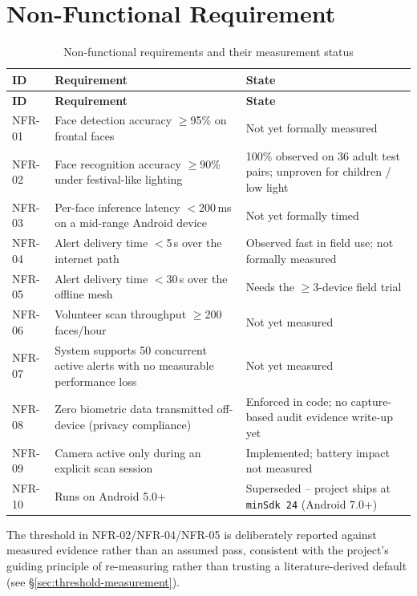 \documentclass[12pt,a4paper,oneside]{report}
\newcommand{\code}[1]{\texttt{#1}}
\begin{document}
\section{Non-Functional Requirement}

\begin{longtable}{|p{1.4cm}|p{7.4cm}|p{4.0cm}|}
\caption{Non-functional requirements and their measurement status}
\label{tab:nfr}\\
\hline
\textbf{ID} & \textbf{Requirement} & \textbf{State} \\
\hline
\endfirsthead
\hline
\textbf{ID} & \textbf{Requirement} & \textbf{State} \\
\hline
\endhead
NFR-01 & Face detection accuracy $\geq$95\% on frontal faces & Not yet formally measured \\ \hline
NFR-02 & Face recognition accuracy $\geq$90\% under festival-like lighting & 100\% observed on 36 adult test pairs; unproven for children / low light \\ \hline
NFR-03 & Per-face inference latency $<$200\,ms on a mid-range Android device & Not yet formally timed \\ \hline
NFR-04 & Alert delivery time $<$5\,s over the internet path & Observed fast in field use; not formally measured \\ \hline
NFR-05 & Alert delivery time $<$30\,s over the offline mesh & Needs the $\geq$3-device field trial \\ \hline
NFR-06 & Volunteer scan throughput $\geq$200 faces/hour & Not yet measured \\ \hline
NFR-07 & System supports 50 concurrent active alerts with no measurable performance loss & Not yet measured \\ \hline
NFR-08 & Zero biometric data transmitted off-device (privacy compliance) & Enforced in code; no capture-based audit evidence write-up yet \\ \hline
NFR-09 & Camera active only during an explicit scan session & Implemented; battery impact not measured \\ \hline
NFR-10 & Runs on Android 5.0+ & Superseded -- project ships at \code{minSdk 24} (Android 7.0+) \\
\hline
\end{longtable}

The threshold in NFR-02/NFR-04/NFR-05 is deliberately reported against
measured evidence rather than an assumed pass, consistent with the
project's guiding principle of re-measuring rather than trusting a
literature-derived default (see \S\ref{sec:threshold-measurement}).
\end{document}
